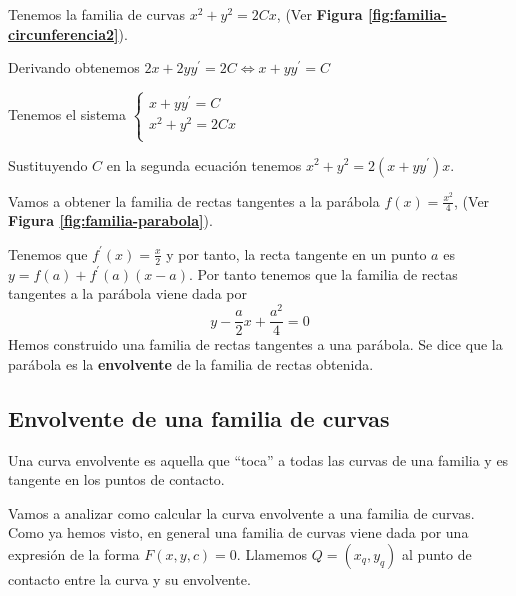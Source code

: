 \begin{example}
Tenemos la familia de curvas $x^2+y^2=2Cx$, (Ver \textbf{Figura \ref{fig:familia-circunferencia2}}).

Derivando obtenemos $2x+2yy^\prime = 2C \iff x+yy^\prime = C$

Tenemos el sistema 
$
  \left\lbrace
  \begin{array}{l}
  	 x+yy^\prime = C \\
     x^2+y^2=2Cx \\
  \end{array}
  \right.
$

Sustituyendo $C$ en la segunda ecuación tenemos $x^2+y^2 = 2(x + yy^\prime)x$.
\end{example}

\begin{example}
Vamos a obtener la familia de rectas tangentes a la parábola $f(x)=\frac{x^2}{4}$, (Ver \textbf{Figura \ref{fig:familia-parabola}}).

Tenemos que $f^\prime(x) =  \frac{x}{2}$ y por tanto, la recta tangente en un punto $a$ es $y=f(a)+f^\prime(a)(x-a)$. Por tanto tenemos que la familia de rectas tangentes a la parábola viene dada por $$y-\frac{a}{2}x + \frac{a^2}{4} = 0$$
Hemos construido una familia de rectas tangentes a una parábola. Se dice que la parábola es la \textbf{envolvente} de la familia de rectas obtenida.
\end{example}

\subsection{Envolvente de una familia de curvas}

\begin{definition}
Una curva envolvente es aquella que ``toca'' a todas las curvas de una familia y es tangente en los puntos de contacto.
\end{definition}


Vamos a analizar como calcular la curva envolvente a una familia de curvas.
Como ya hemos visto, en general una familia de curvas viene dada por una expresión de la forma $F(x,y,c) = 0$. Llamemos $Q=(x_q, y_q)$ al punto de contacto entre la curva y su envolvente.

